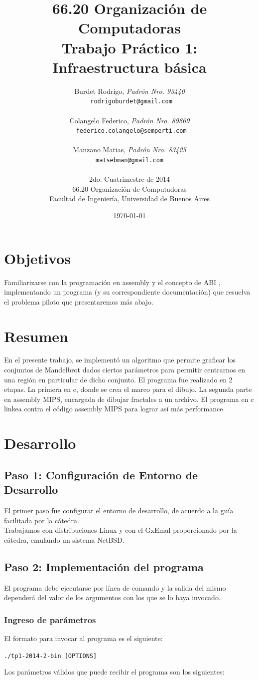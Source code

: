 \documentclass[a4paper,10pt,oneside]{article}
\title{\textbf{66.20 Organización de Computadoras\\ Trabajo Práctico 1: \\ Infraestructura básica}}
\author{	Burdet Rodrigo, \textit{Padrón Nro. 93440}\\
            \texttt{ rodrigoburdet@gmail.com}\\\\
            Colangelo Federico, \textit{Padrón Nro. 89869}                     \\
            \texttt{ federico.colangelo@semperti.com}\\\\
            Manzano Matias, \textit{Padrón Nro. 83425}                     \\
            \texttt{ matsebman@gmail.com }\\\\[2.5ex]
            \normalsize{2do. Cuatrimestre de 2014}                       \\
			\normalsize{66.20 Organización de Computadoras}\\
            \normalsize{Facultad de Ingeniería, Universidad de Buenos Aires}            \\
       }
\date{\today}
\begin{document}
\maketitle

\thispagestyle{empty}

\newpage

\section{Objetivos}
    Familiarizarse con la programación en assembly y el concepto de ABI
, implementando un programa (y su correspondiente documentación) que resuelva el problema piloto que presentaremos más abajo.
\section{Resumen}
	En el presente trabajo, se implementó un algoritmo que permite graficar los conjuntos de Mandelbrot dados ciertos parámetros para permitir centrarnos en una región en particular de dicho conjunto.
	El programa fue realizado en 2 etapas. La primera en c, donde se crea el marco para el dibujo. La segunda parte en assembly MIPS, encargada de dibujar  fractales a un archivo. El programa en c linkea contra el código assembly MIPS para lograr así más performance.

\section{Desarrollo}
	
\subsection{Paso 1: Configuración de Entorno de Desarrollo}
El primer paso fue configurar el entorno de desarrollo, de acuerdo a la guía facilitada por la cátedra. \\
Trabajamos con distribuciones Linux y con el GxEmul proporcionado por la cátedra, emulando un sistema NetBSD.	
\subsection{Paso 2: Implementación del programa}
El programa debe ejecutarse por línea de comando y la salida del mismo dependerá del valor de los argumentos con los que se lo haya invocado.
\subsubsection{Ingreso de parámetros}
El formato para invocar al programa es el siguiente:
\begin{center}
	\texttt{./tp1-2014-2-bin [OPTIONS]}
\end{center}
Los parámetros válidos que puede recibir el programa son los siguientes: \\ 
\end{document}
